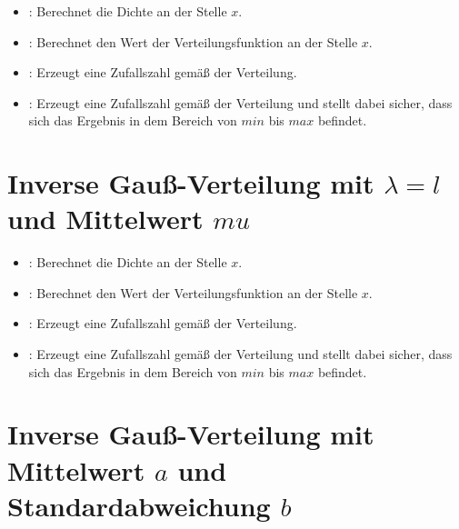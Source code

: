 \begin{itemize}

\item
{}:
Berechnet die Dichte an der Stelle $x$.

\item
{}:
Berechnet den Wert der Verteilungsfunktion an der Stelle $x$.

\item
{}:
Erzeugt eine Zufallszahl gemäß der Verteilung.

\item
{}:
Erzeugt eine Zufallszahl gemäß der Verteilung und stellt dabei sicher, dass sich das Ergebnis in dem Bereich von $min$ bis $max$ befindet.

\end{itemize}


	
\section{Inverse Gauß-Verteilung mit \texorpdfstring{$\lambda=l$}{l} und Mittelwert \texorpdfstring{$mu$}{mu}}

\begin{itemize}

\item
{}:
Berechnet die Dichte an der Stelle $x$.

\item
{}:
Berechnet den Wert der Verteilungsfunktion an der Stelle $x$.

\item
{}:
Erzeugt eine Zufallszahl gemäß der Verteilung.

\item
{}:
Erzeugt eine Zufallszahl gemäß der Verteilung und stellt dabei sicher, dass sich das Ergebnis in dem Bereich von $min$ bis $max$ befindet.

\end{itemize}



\section{Inverse Gauß-Verteilung mit Mittelwert \texorpdfstring{$a$}{a} und Standardabweichung \texorpdfstring{$b$}{b}}

